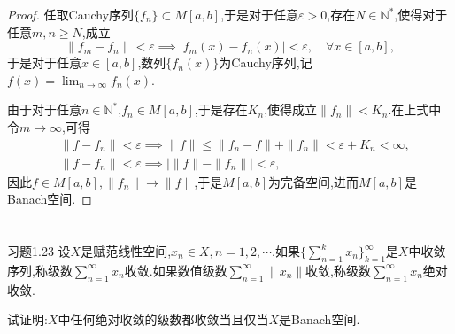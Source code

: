 \documentclass[lang = cn, scheme = chinese]{elegantbook}
\begin{document}
	
	\begin{proof}
		任取Cauchy序列$\{f_n\}\subset M[a,b]$,于是对于任意$\varepsilon>0$,存在$N\in\mathbb{N}^*$,使得对于任意$m,n\ge N$,成立
		$$
		\|f_m-f_n\|<\varepsilon \implies|f_m(x)-f_n(x)|<\varepsilon,\quad \forall x\in[a,b],
		$$
		于是对于任意$x\in[a,b]$,数列$\{f_n(x)\}$为Cauchy序列,记$\displaystyle f(x)=\lim_{n\to\infty}f_n(x)$.
		
		由于对于任意$n\in\mathbb{N}^*$,$f_n\in M[a,b]$,于是存在$K_n$,使得成立$\|f_n\|<K_n$.在上式中令$m\to\infty$,可得
		\begin{align*}
			&\|f-f_n\|<\varepsilon\implies\|f\|\le \|f_n-f\|+\|f_n\|<\varepsilon+K_n<\infty,\\
			&\|f-f_n\|<\varepsilon\implies |\|f\|-\|f_n\||<\varepsilon,
		\end{align*}
		因此$f\in M[a,b],\|f_n\|\to\|f\|$,于是$M[a,b]$为完备空间,进而$M[a,b]$是Banach空间.
	\end{proof}
	
	\chapter{}
	
	\begin{proposition}{习题1.23}
		设$X$是赋范线性空间,$x_n\in X,n=1,2,\cdots$.如果$\displaystyle\{\sum_{n=1}^{k}x_n\}_{k=1}^{\infty}$是$X$中收敛序列,称级数$\displaystyle\sum_{n=1}^{\infty}x_n$收敛.如果数值级数$\displaystyle\sum_{n=1}^{\infty}\|x_n\|$收敛,称级数$\displaystyle\sum_{n=1}^{\infty}x_n$绝对收敛.
		
		试证明:$X$中任何绝对收敛的级数都收敛当且仅当$X$是Banach空间.
	\end{proposition}
	
\end{document}
